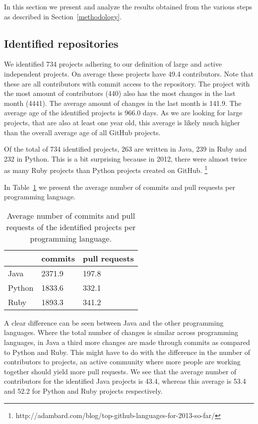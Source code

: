 In this section we present and analyze the results obtained from the various steps as described in Section~\ref{methodology}.

\subsection{Identified repositories}
We identified 734 projects adhering to our definition of large and active independent projects.
On average these projects have 49.4 contributors. 
Note that these are all contributors with commit access to the repository.
The project with the most amount of contributors (440) also has the most changes in the last month (4441).
The average amount of changes in the last month is 141.9.
The average age of the identified projects is 966.0 days. 
As we are looking for large projects, that are also at least one year old, this average is likely much higher than the overall average age of all GitHub projects.

Of the total of 734 identified projects, 263 are written in Java, 239 in Ruby and 232 in Python. 
This is a bit surprising because in 2012, there were almost twice as many Ruby projects than Python projects created on GitHub. \footnote{http://adambard.com/blog/top-github-languages-for-2013-so-far/}

In Table~\ref{tab:allChanges} we present the average number of commits and pull requests per programming language.
\begin{table}[h]
\begin{tabular}{ l | l l }
 & commits & pull requests\\
\hline
Java & 2371.9 & 197.8 \\
Python & 1833.6 & 332.1 \\
Ruby & 1893.3 & 341.2
\end{tabular}
\caption{Average number of commits and pull requests of the identified projects per programming language.}
\label{tab:allChanges}
\end{table}
A clear difference can be seen between Java and the other programming languages. 
Where the total number of changes is similar across programming languages, in Java a third more changes are made through commits as compared to Python and Ruby.
This might have to do with the difference in the number of contributors to projects, an active community where more people are working together should yield more pull requests.
We see that the average number of contributors for the identified Java projects is 43.4, whereas this average is 53.4 and 52.2 for Python and Ruby projects respectively.

